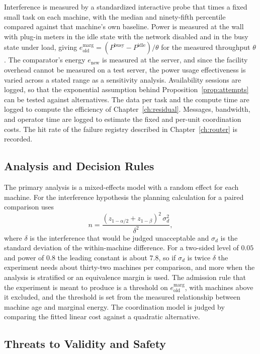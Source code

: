 Interference is measured by a standardized interactive probe that times a fixed small task on each machine, with the median and ninety-fifth percentile compared against that machine's own baseline. Power is measured at the wall with plug-in meters in the idle state with the network disabled and in the busy state under load, giving $e^{\mathrm{marg}}_{\mathrm{old}}=(P^{\mathrm{busy}}-P^{\mathrm{idle}})/\theta$ for the measured throughput $\theta$. The comparator's energy $e_{\mathrm{new}}$ is measured at the server, and since the facility overhead cannot be measured on a test server, the power usage effectiveness is varied across a stated range as a sensitivity analysis. Availability sessions are logged, so that the exponential assumption behind Proposition~\ref{prop:attempts} can be tested against alternatives. The data per task and the compute time are logged to compute the efficiency of Chapter~\ref{ch:residual}. Messages, bandwidth, and operator time are logged to estimate the fixed and per-unit coordination costs. The hit rate of the failure registry described in Chapter~\ref{ch:router} is recorded.

\subsection*{Analysis and Decision Rules}

The primary analysis is a mixed-effects model with a random effect for each machine. For the interference hypothesis the planning calculation for a paired comparison uses
\[
n=\frac{(z_{1-\alpha/2}+z_{1-\beta})^{2}\,\sigma_d^{2}}{\delta^{2}},
\]
where $\delta$ is the interference that would be judged unacceptable and $\sigma_d$ is the standard deviation of the within-machine difference. For a two-sided level of $0.05$ and power of $0.8$ the leading constant is about $7.8$, so if $\sigma_d$ is twice $\delta$ the experiment needs about thirty-two machines per comparison, and more when the analysis is stratified or an equivalence margin is used. The admission rule that the experiment is meant to produce is a threshold on $e^{\mathrm{marg}}_{\mathrm{old}}$, with machines above it excluded, and the threshold is set from the measured relationship between machine age and marginal energy. The coordination model is judged by comparing the fitted linear cost against a quadratic alternative.

\subsection*{Threats to Validity and Safety}


